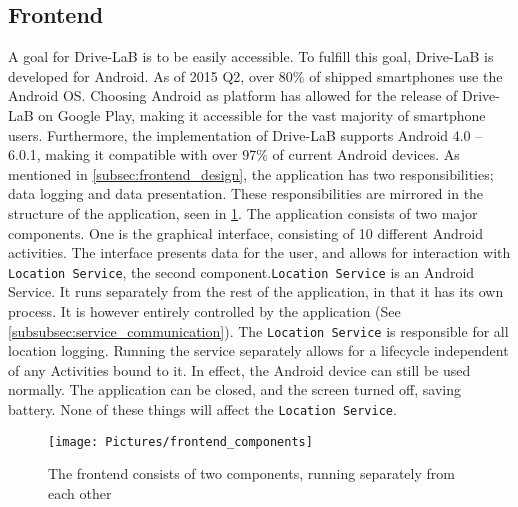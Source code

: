 \subsection{Frontend}\label{subsec:frontend_implementation}
A goal for Drive-LaB is to be easily accessible. To fulfill this goal, Drive-LaB is developed for Android. As of 2015 Q2, over 80\% of shipped smartphones use the Android OS\citep{smartphone_market_share}. Choosing Android as platform has allowed for the release of Drive-LaB on Google Play\citep{google_play_drivelab}, making it accessible for the vast majority of smartphone users. Furthermore, the implementation of Drive-LaB supports Android 4.0 – 6.0.1, making it compatible with over 97\% of current Android devices\citep{android_version_distribution}.
As mentioned in \ref{subsec:frontend_design}, the application has two responsibilities; data logging and data presentation. These responsibilities are mirrored in the structure of the application, seen in \ref{fig:frontend_components}. The application consists of two major components. One is the graphical interface, consisting of 10 different Android activities\citep{android_activity}. The interface presents data for the user, and allows for interaction with \texttt{Location Service}, the second component.\texttt{Location Service} is an Android Service\citep{android_service}. It runs separately from the rest of the application, in that it has its own process. It is however entirely controlled by the application (See \ref{subsubsec:service_communication}). The \texttt{Location Service} is responsible for all location logging. Running the service separately allows for a lifecycle independent of any Activities bound to it. In effect, the Android device can still be used normally. The application can be closed, and the screen turned off, saving battery. None of these things will affect the \texttt{Location Service}.

\begin{figure}[tb]
\centering
\texttt{[image: Pictures/frontend\_components]}
\caption{The frontend consists of two components, running separately from each other}
\label{fig:frontend_components}
\end{figure}

